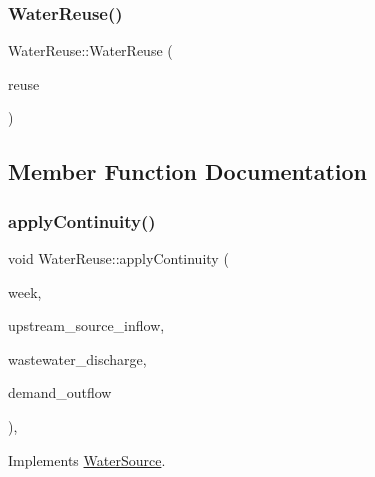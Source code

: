 \mbox{\label{classWaterReuse_abe522bfe68c8b0bd05c4e608f3f6e6ba_abe522bfe68c8b0bd05c4e608f3f6e6ba}} 
\subsubsection{\texorpdfstring{Water\+Reuse()}{WaterReuse()}\hspace{0.1cm}{\footnotesize\ttfamily [3/3]}}
{\footnotesize\ttfamily Water\+Reuse\+::\+Water\+Reuse (\begin{DoxyParamCaption}\item[{const \mbox{\hyperlink{classWaterReuse}{Water\+Reuse}} \&}]{reuse }\end{DoxyParamCaption})}



\subsection{Member Function Documentation}
\mbox{\label{classWaterReuse_ab8ffb10c69790047a3a5dda66cfaf3ee_ab8ffb10c69790047a3a5dda66cfaf3ee}} 
\subsubsection{\texorpdfstring{apply\+Continuity()}{applyContinuity()}}
{\footnotesize\ttfamily void Water\+Reuse\+::apply\+Continuity (\begin{DoxyParamCaption}\item[{int}]{week,  }\item[{double}]{upstream\+\_\+source\+\_\+inflow,  }\item[{double}]{wastewater\+\_\+discharge,  }\item[{vector$<$ double $>$ \&}]{demand\+\_\+outflow }\end{DoxyParamCaption})\hspace{0.3cm}{\ttfamily [override]}, {\ttfamily [virtual]}}



Implements \mbox{\hyperlink{classWaterSource_ac070445379fe706f65b977dade4f3fbc_ac070445379fe706f65b977dade4f3fbc}{Water\+Source}}.

